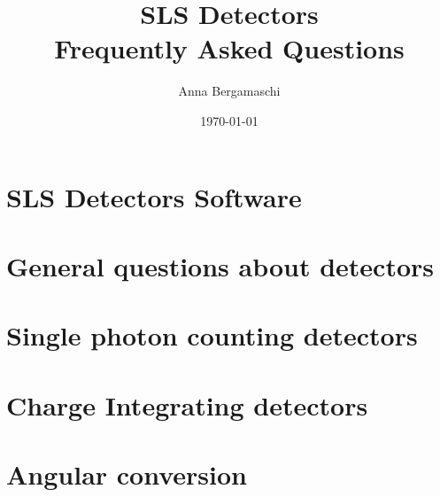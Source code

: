 \documentclass{report}
\begin{document}
\title{SLS Detectors\\ Frequently Asked Questions}
\author{Anna Bergamaschi}
\date{\today}
\maketitle
\tableofcontents
\clearpage
\chapter{SLS Detectors Software}


\chapter{General questions about detectors}


\chapter{Single photon counting detectors}




\chapter{Charge Integrating detectors}



\chapter{Angular conversion}

\end{document}
